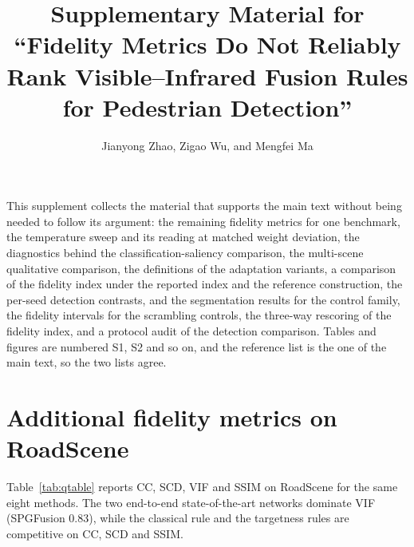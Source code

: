 \documentclass[10pt,a4paper]{article}
\begin{document}
\title{Supplementary Material for ``Fidelity Metrics Do Not Reliably Rank
Visible--Infrared Fusion Rules for Pedestrian Detection''}
\author{Jianyong Zhao, Zigao Wu, and Mengfei Ma}
\date{}
\maketitle

This supplement collects the material that supports the main text without being
needed to follow its argument: the remaining fidelity metrics for one benchmark,
the temperature sweep and its reading at matched weight deviation, the diagnostics
behind the classification-saliency comparison, the multi-scene qualitative
comparison, the definitions of the adaptation variants, a comparison of the
fidelity index under the reported index and the reference construction, the per-seed
detection contrasts, and
the segmentation results for the control family, the fidelity intervals for the
scrambling controls, the three-way rescoring of the fidelity index, and a protocol
audit of the detection comparison. Tables and figures are numbered
S1, S2 and so on, and the reference list is the one of the main text, so the two
lists agree.

\section{Additional fidelity metrics on RoadScene}

Table~\ref{tab:qtable} reports CC, SCD, VIF and SSIM on RoadScene for the same
eight methods. The two end-to-end state-of-the-art networks dominate VIF
(SPGFusion 0.83), while the classical rule and the targetness rules are
competitive on CC, SCD and SSIM.
\end{document}
